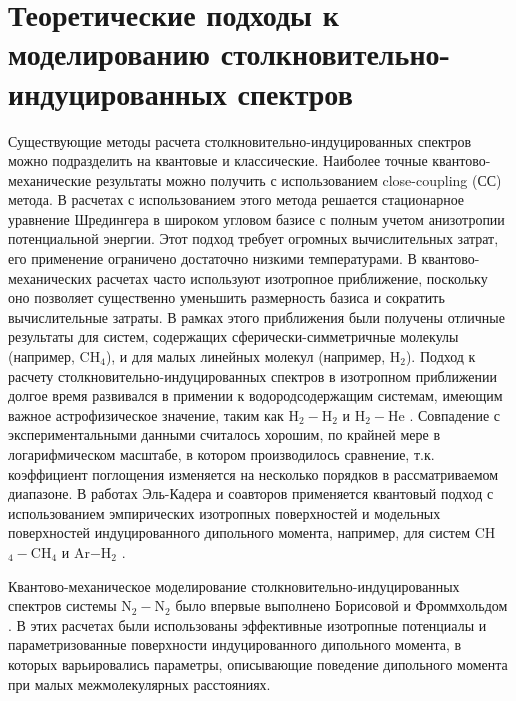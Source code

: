\section{Теоретические подходы к моделированию столкновительно-индуцированных спектров}

Существующие методы расчета столкновительно-индуцированных спектров можно подразделить на квантовые и классические. Наиболее точные квантово-механические результаты можно получить с использованием close-coupling (СС) метода. В расчетах с использованием этого метода решается стационарное уравнение Шредингера в широком угловом базисе с полным учетом анизотропии потенциальной энергии. Этот подход требует огромных вычислительных затрат, его применение ограничено достаточно низкими температурами. В квантово-механических расчетах часто используют изотропное приближение, поскольку оно позволяет существенно уменьшить размерность базиса и сократить вычислительные затраты. В рамках этого приближения были получены отличные результаты для систем, содержащих сферически-симметричные молекулы (например, CH$_4$), и для малых линейных молекул (например, H$_2$). Подход к расчету столкновительно-индуцированных спектров в изотропном приближении долгое время развивался в примении к водородсодержащим системам, имеющим важное астрофизическое значение, таким как H$_2-$H$_2$ \cite{abel2009} и H$_2-$He \cite{abel2012}. Совпадение с экспериментальными данными считалось хорошим, по крайней мере в логарифмическом масштабе, в котором производилось сравнение, т.к. коэффициент поглощения изменяется на несколько порядков в рассматриваемом диапазоне. В работах Эль-Кадера и соавторов применяется квантовый подход с использованием эмпирических изотропных поверхностей и модельных поверхностей индуцированного дипольного момента, например, для систем CH$_4-$CH$_4$ \cite{elkader2012} и Ar$-$H$_2$ \cite{elkader2017}. \par
Квантово-механическое моделирование столкновительно-индуцированных спектров системы N$_2-$N$_2$ было впервые выполнено Борисовой и Фроммхольдом \cite{borysow1986}. В этих расчетах были использованы эффективные изотропные потенциалы и параметризованные поверхности индуцированного дипольного момента, в которых варьировались параметры, описывающие поведение дипольного момента при малых межмолекулярных расстояниях. \par
